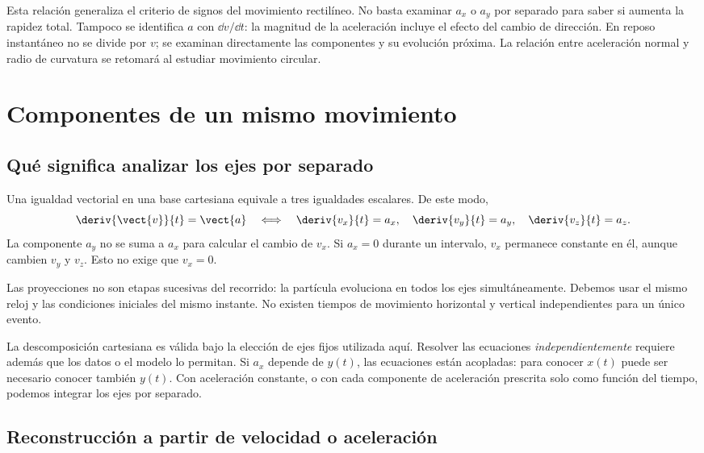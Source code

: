 Esta relación generaliza el criterio de signos del movimiento rectilíneo.
No basta examinar \(a_x\) o \(a_y\) por separado para saber si aumenta
la rapidez total. Tampoco se identifica \(a\) con \(\dd v/\dd t\): la
magnitud de la aceleración incluye el efecto del cambio de dirección.
En reposo instantáneo no se divide por \(v\); se examinan directamente
las componentes y su evolución próxima. La relación entre aceleración
normal y radio de curvatura se retomará al estudiar movimiento circular.

\section{Componentes de un mismo movimiento}

\subsection{Qué significa analizar los ejes por separado}

Una igualdad vectorial en una base cartesiana equivale a tres igualdades
escalares. De este modo,
\[ \deriv{\vect{v}}{t}=\vect{a}
\quad\Longleftrightarrow\quad
\deriv{v_x}{t}=a_x,\quad \deriv{v_y}{t}=a_y,\quad \deriv{v_z}{t}=a_z. \]
La componente \(a_y\) no se suma a \(a_x\) para calcular el cambio de
\(v_x\). Si \(a_x=0\) durante un intervalo, \(v_x\) permanece constante
en él, aunque cambien \(v_y\) y \(v_z\). Esto no exige que \(v_x=0\).

Las proyecciones no son etapas sucesivas del recorrido: la partícula
evoluciona en todos los ejes simultáneamente. Debemos usar el mismo reloj
y las condiciones iniciales del mismo instante. No existen tiempos de
movimiento horizontal y vertical independientes para un único evento.

\begin{advertencia}
La descomposición cartesiana es válida bajo la elección de ejes fijos
utilizada aquí. Resolver las ecuaciones \emph{independientemente} requiere
además que los datos o el modelo lo permitan. Si \(a_x\) depende de
\(y(t)\), las ecuaciones están acopladas: para conocer \(x(t)\) puede
ser necesario conocer también \(y(t)\). Con aceleración constante, o con
cada componente de aceleración prescrita solo como función del tiempo,
podemos integrar los ejes por separado.
\end{advertencia}

\subsection{Reconstrucción a partir de velocidad o aceleración}

